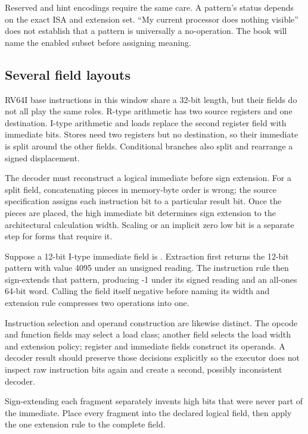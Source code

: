 Reserved and hint encodings require the same care. A pattern's status depends
on the exact ISA and extension set. ``My current processor does nothing
visible'' does not establish that a pattern is universally a no-operation.
The book will name the enabled subset before assigning meaning.

\subsection{Several field layouts}

RV64I base instructions in this window share a 32-bit length, but their fields
do not all play the same roles. R-type arithmetic has two source registers and
one destination. I-type arithmetic and loads replace the second register field
with immediate bits. Stores need two registers but no destination, so their
immediate is split around the other fields. Conditional branches also split
and rearrange a signed displacement.

The decoder must reconstruct a logical immediate before sign extension. For a
split field, concatenating pieces in memory-byte order is wrong; the source
specification assigns each instruction bit to a particular result bit. Once
the pieces are placed, the high immediate bit determines sign extension to the
architectural calculation width. Scaling or an implicit zero low bit is a
separate step for forms that require it.

\begin{example}[title={Field extraction precedes interpretation}]
Suppose a 12-bit I-type immediate field is . Extraction first
returns the 12-bit pattern with value 4095 under an unsigned reading. The
instruction rule then sign-extends that pattern, producing -1 under its signed
reading and an all-ones 64-bit word. Calling the field itself negative before
naming its width and extension rule compresses two operations into one.
\end{example}

Instruction selection and operand construction are likewise distinct. The
opcode and function fields may select a load class; another field selects the
load width and extension policy; register and immediate fields construct its
operands. A decoder result should preserve those decisions explicitly so the
executor does not inspect raw instruction bits again and create a second,
possibly inconsistent decoder.

\begin{warning}[title={Do not sign-extend before reassembling a split field}]
Sign-extending each fragment separately invents high bits that were never part
of the immediate. Place every fragment into the declared logical field, then
apply the one extension rule to the complete field.
\end{warning}

